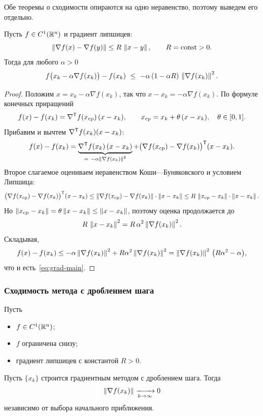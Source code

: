 Обе теоремы о сходимости опираются на одно неравенство, поэтому выведем его
отдельно.

\begin{lemma}\label{lem:grad-main}
Пусть $f \in C^1(\mathbb{R}^n)$ и градиент липшицев:
\[
  \left\lVert \nabla f(x) - \nabla f(y) \right\rVert \le R\,\left\lVert x-y \right\rVert,
  \qquad R = \mathrm{const} > 0 .
\]
Тогда для любого $\alpha > 0$
\begin{equation}\label{eq:grad-main}
  f\big(x_k - \alpha \nabla f(x_k)\big) - f(x_k)
  \ \le\ -\alpha\,(1 - \alpha R)\, \left\lVert \nabla f(x_k) \right\rVert^2 .
\end{equation}
\end{lemma}

\begin{proof}
Положим $x = x_k - \alpha \nabla f(x_k)$, так что
$x - x_k = -\alpha\nabla f(x_k)$. По формуле конечных приращений
\[
  f(x) - f(x_k) = \nabla^{\mathsf{T}} f(x_{\mathrm{cp}})\,(x - x_k),
  \qquad
  x_{\mathrm{cp}} = x_k + \theta\,(x - x_k), \quad \theta \in [0,1] .
\]
Прибавим и вычтем $\nabla^{\mathsf{T}} f(x_k)(x-x_k)$:
\[
  f(x) - f(x_k)
  = \underbrace{\nabla^{\mathsf{T}} f(x_k)\,(x-x_k)}_{=\ -\alpha\left\lVert \nabla f(x_k) \right\rVert^2}
  + \big(\nabla f(x_{\mathrm{cp}}) - \nabla f(x_k)\big)^{\mathsf{T}} (x - x_k) .
\]
Второе слагаемое оцениваем неравенством Коши—Буняковского и условием
Липшица:
\[
  \big(\nabla f(x_{\mathrm{cp}}) - \nabla f(x_k)\big)^{\mathsf{T}} (x - x_k)
  \le \left\lVert \nabla f(x_{\mathrm{cp}}) - \nabla f(x_k) \right\rVert\cdot\left\lVert x-x_k \right\rVert
  \le R\,\left\lVert x_{\mathrm{cp}} - x_k \right\rVert\cdot\left\lVert x - x_k \right\rVert .
\]
Но $\left\lVert x_{\mathrm{cp}} - x_k \right\rVert = \theta\left\lVert x-x_k \right\rVert \le \left\lVert x-x_k \right\rVert$,
поэтому оценка продолжается до
\[
  R\,\left\lVert x-x_k \right\rVert^2 = R\,\alpha^2 \left\lVert \nabla f(x_k) \right\rVert^2 .
\]
Складывая,
\[
  f(x) - f(x_k)
  \le -\alpha\left\lVert \nabla f(x_k) \right\rVert^2 + R\alpha^2\left\lVert \nabla f(x_k) \right\rVert^2
  = \left\lVert \nabla f(x_k) \right\rVert^2\,\big(R\alpha^2 - \alpha\big) ,
\]
что и есть~\eqref{eq:grad-main}.
\end{proof}

\subsubsection*{Сходимость метода с дроблением шага}

\begin{theorem}\label{thm:grad-split}
Пусть
\begin{itemize}[leftmargin=1.6em, topsep=2pt]
  \item $f \in C^1(\mathbb{R}^n)$;
  \item $f$ ограничена снизу;
  \item градиент липшицев с константой $R > 0$.
\end{itemize}
Пусть $\{x_k\}$ строится градиентным методом с дроблением шага. Тогда
\[
  \left\lVert \nabla f(x_k) \right\rVert \xrightarrow[k \to \infty]{} 0
\]
независимо от выбора начального приближения.
\end{theorem}


